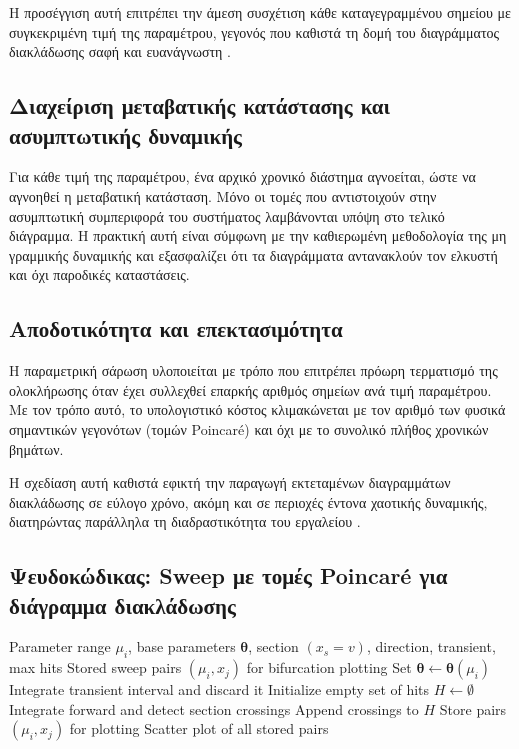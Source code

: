 \documentclass[11pt,a4paper]{report}
\begin{document}
Η προσέγγιση αυτή επιτρέπει την άμεση συσχέτιση κάθε καταγεγραμμένου
σημείου με συγκεκριμένη τιμή της παραμέτρου, γεγονός που καθιστά τη
δομή του διαγράμματος διακλάδωσης σαφή και ευανάγνωστη \cite{nlds_internal_md_docs}.

\subsection{Διαχείριση μεταβατικής κατάστασης και ασυμπτωτικής δυναμικής}
Για κάθε τιμή της παραμέτρου, ένα αρχικό χρονικό διάστημα αγνοείται,
ώστε να αγνοηθεί η μεταβατική κατάσταση. Μόνο οι τομές που
αντιστοιχούν στην ασυμπτωτική συμπεριφορά του συστήματος λαμβάνονται
υπόψη στο τελικό διάγραμμα. Η πρακτική αυτή είναι σύμφωνη με την
καθιερωμένη μεθοδολογία της μη γραμμικής δυναμικής και εξασφαλίζει ότι
τα διαγράμματα αντανακλούν τον ελκυστή και όχι παροδικές καταστάσεις.

\subsection{Αποδοτικότητα και επεκτασιμότητα}
Η παραμετρική σάρωση υλοποιείται με τρόπο που επιτρέπει πρόωρη
τερματισμό της ολοκλήρωσης όταν έχει συλλεχθεί επαρκής αριθμός σημείων
ανά τιμή παραμέτρου. Με τον τρόπο αυτό, το υπολογιστικό κόστος
κλιμακώνεται με τον αριθμό των φυσικά σημαντικών γεγονότων (τομών
Poincaré) και όχι με το συνολικό πλήθος χρονικών βημάτων.

Η σχεδίαση αυτή καθιστά εφικτή την παραγωγή εκτεταμένων διαγραμμάτων
διακλάδωσης σε εύλογο χρόνο, ακόμη και σε περιοχές έντονα χαοτικής
δυναμικής, διατηρώντας παράλληλα τη διαδραστικότητα του εργαλείου
\cite{nlds_internal_md_docs}.

\subsection*{Ψευδοκώδικας: Sweep με τομές Poincaré για διάγραμμα διακλάδωσης}
\begin{tcolorbox}
\label{alg:poincare-sweep}
\begin{algorithmic}[1]
\Require Parameter range $\mu_i$, base parameters $\boldsymbol{\theta}$, section $(x_s=v)$, direction, transient, max hits
\Ensure Stored sweep pairs $(\mu_i, x_j)$ for bifurcation plotting
  \State Set $\boldsymbol{\theta}\leftarrow \boldsymbol{\theta}(\mu_i)$
  \State Integrate transient interval and discard it
  \State Initialize empty set of hits $H\leftarrow \emptyset$
     \State Integrate forward and detect section crossings
     \State Append crossings to $H$
  \EndWhile
  \State Store pairs $(\mu_i, x_j)$ for plotting
\EndFor
\State Scatter plot of all stored pairs
\end{algorithmic}
\end{tcolorbox}
\end{document}
